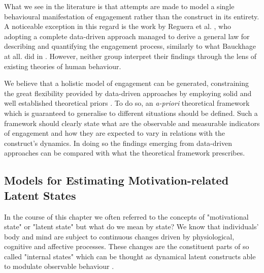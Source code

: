 What we see in the literature is that attempts are made to model a single behavioural manifestation of engagement rather than the construct in its entirety. A noticeable exception in this regard is the work by Reguera et al. \cite{reguera2020quantifying}, who adopting a complete data-driven approach managed to derive a general law for describing and quantifying the engagement process, similarly to what Bauckhage at all. did in \cite{bauckhage2012players}. However, neither group interpret their findings through the lens of existing theories of human behaviour. 

We believe that a holistic model of engagement can be generated, constraining the great flexibility provided by data-driven approaches by employing solid and well established theoretical priors \cite{yannakakis2013player}. To do so, an \textit{a-priori} theoretical framework which is guaranteed to generalise to different situations should be defined. Such a framework should clearly state what are the observable and measurable indicators of engagement and how they are expected to vary in relations with the construct's dynamics. In doing so the findings emerging from data-driven approaches can be compared with what the theoretical framework prescribes. 

\subsection{Models for Estimating Motivation-related Latent States}
\label{latent_states_estimation}
In the course of this chapter we often referred to the concepts of "motivational state" or "latent state" but what do we mean by state? We know that individuals' body and mind are subject to continuous changes driven by physiological, cognitive and affective processes. These changes are the constituent parts of so called "internal states"  which can be thought as dynamical latent constructs able to modulate observable behaviour \cite{eyjolfsdottir2016learning,song2017reward,merel2019deep,calhoun2019unsupervised}. 

